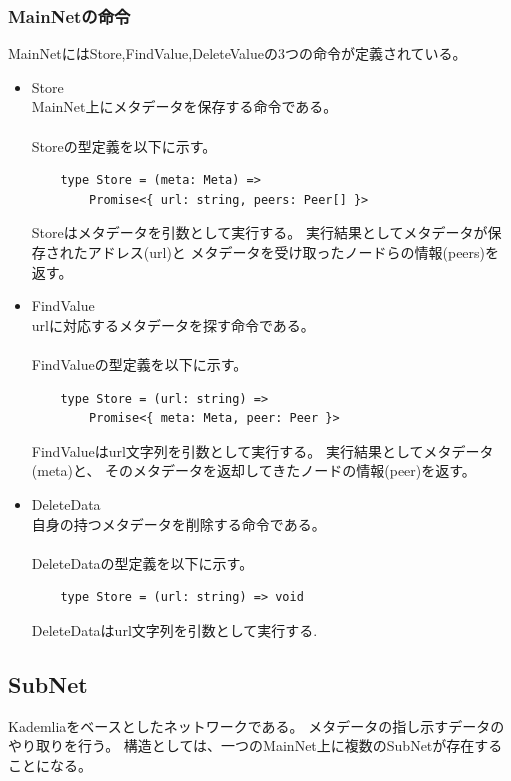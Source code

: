 \documentclass[sotsuron]{jcsie}
\begin{document}
\subsubsection{MainNetの命令}
MainNetにはStore,FindValue,DeleteValueの3つの命令が定義されている。

\begin{itemize}
	\item {Store}\\
	MainNet上にメタデータを保存する命令である。
	\\\\
	Storeの型定義を以下に示す。
	\begin{lstlisting}
	type Store = (meta: Meta) => 
		Promise<{ url: string, peers: Peer[] }>
	\end{lstlisting}

	Storeはメタデータを引数として実行する。
	実行結果としてメタデータが保存されたアドレス(url)と
	メタデータを受け取ったノードらの情報(peers)を返す。
	\\
	\item {FindValue}\\
	urlに対応するメタデータを探す命令である。
	\\\\
	FindValueの型定義を以下に示す。
	\begin{lstlisting}
	type Store = (url: string) => 
		Promise<{ meta: Meta, peer: Peer }>
	\end{lstlisting}

	FindValueはurl文字列を引数として実行する。
	実行結果としてメタデータ(meta)と、
	そのメタデータを返却してきたノードの情報(peer)を返す。
	\\
	\item {DeleteData}\\
	自身の持つメタデータを削除する命令である。
	\\\\
	DeleteDataの型定義を以下に示す。
	\begin{lstlisting}
	type Store = (url: string) => void
	\end{lstlisting}

	DeleteDataはurl文字列を引数として実行する.
\end{itemize}

\subsection{SubNet}
Kademliaをベースとしたネットワークである。
メタデータの指し示すデータのやり取りを行う。
構造としては、一つのMainNet上に複数のSubNetが存在することになる。
\end{document}
